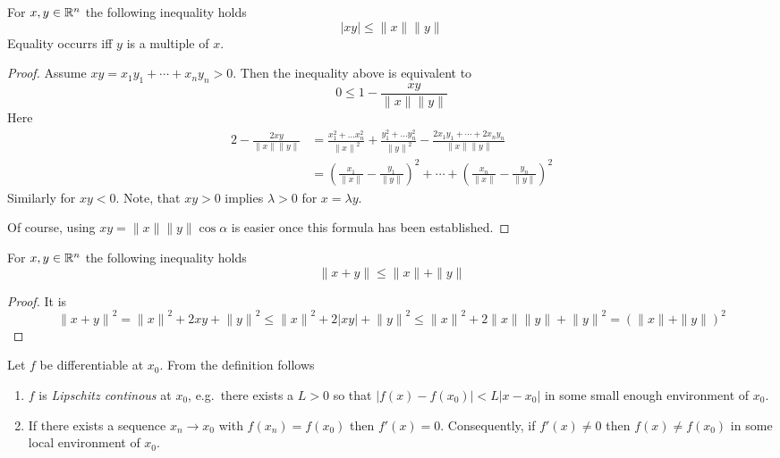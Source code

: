 \begin{lemma}\label{thm:cauchy_schwarz_inequality}
    For \( x, y \in \mathbb{R}^n \) the following inequality holds
    \[
        |xy| \le \|x\| \|y\|
    \]
    Equality occurrs iff \( y \) is a multiple of \( x \).
\end{lemma}
\begin{proof}
    Assume \( xy = x_1 y_1 + \cdots + x_n y_n > 0 \). Then the inequality above is equivalent to
    \[ 0 \le 1 - \frac{xy}{\|x\| \|y\|} \]
    Here
    \[
        \begin{split}
            2 - \frac{2xy}{\|x\| \|y\|}
            & = \frac{x_1^2 + \dots x_n^2}{{\|x\|}^2} +
            \frac{y_1^2 + \dots y_n^2}{{\|y\|}^2} - \frac{2x_1 y_1 + \cdots + 2x_n y_n}{\|x\| \|y\|} \\
            & = {\left( \frac{x_1}{\|x\|} - \frac{y_1}{\|y\|} \right)}^2 + \cdots +
            {\left( \frac{x_n}{\|x\|} - \frac{y_n}{\|y\|} \right)}^2
        \end{split}
    \]
    Similarly for \( xy < 0 \). Note, that \( xy > 0 \) implies \( \lambda > 0 \) for \( x = \lambda y\). 

    Of course, using \( xy = \|x\| \|y\| \cos\alpha \) is easier once this formula has been established.

\end{proof}
\bigskip


\begin{lemma}\label{thm:triangle_inequality}
    For \( x, y \in \mathbb{R}^n \) the following inequality holds
    \[
        \|x + y\| \le \|x\| + \|y\|
    \]
\end{lemma}
\begin{proof}
    It is
    \[
        {\|x + y\|}^2 = {\|x\|}^2 + 2xy + {\|y\|}^2 \le {\|x\|}^2 + 2|xy| + {\|y\|}^2
        \le {\|x\|}^2 + 2\|x\| \|y\| + {\|y\|}^2 = {(\|x\| + \|y\|)}^2
    \]
\end{proof}
\bigskip


\begin{remarks}Let \( f \) be differentiable at \( x_0 \). From the definition follows
    \begin{enumerate}
        \item \( f \) is \emph{Lipschitz continous} at \( x_0 \), e.g.\ there exists a \( L > 0 \) so that
              \( |f(x) - f(x_0)| < L|x - x_0| \) in some small enough environment of \( x_0 \).
        \item If there exists a sequence  \( x_n \to x_0 \) with \( f(x_n) = f(x_0) \) then \( f'(x) = 0 \).
              Consequently, if \( f'(x) \ne 0 \) then \( f(x) \ne f(x_0) \) in some local environment of \( x_0 \).
    \end{enumerate}
\end{remarks}
\bigskip

